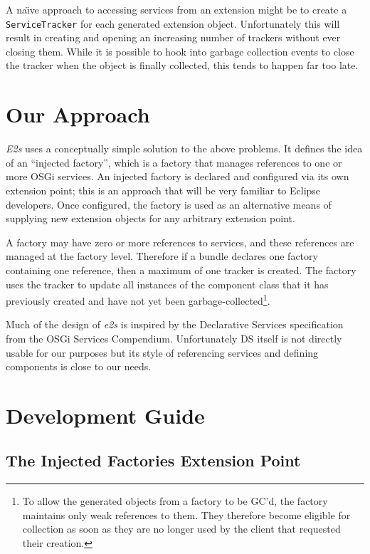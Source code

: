 \documentclass[12pt]{article}
\begin{document}
A na\"\i{}ve approach to accessing services from an extension might be to create a \texttt{ServiceTracker} for each generated extension object. Unfortunately this will result in creating and opening an increasing number of trackers without ever closing them. While it is possible to hook into garbage collection events to close the tracker when the object is finally collected, this tends to happen far too late.

\section{Our Approach}

\emph{E2s} uses a conceptually simple solution to the above problems. It defines
the idea of an ``injected factory'', which is a factory that manages references
to one or more OSGi services. An injected factory is declared and configured via
its own extension point; this is an approach that will be very familiar to
Eclipse developers. Once configured, the factory is used as an alternative means
of supplying new extension objects for any arbitrary extension point.

A factory may have zero or more references to services, and these references are
managed at the factory level. Therefore if a bundle declares one factory
containing one reference, then a maximum of one tracker is created. The factory
uses the tracker to update all instances of the component class that it has
previously created and have not yet been garbage-collected\footnote{To allow the
generated objects from a factory to be GC'd, the factory maintains only weak
references to them. They therefore become eligible for collection as soon as they
are no longer used by the client that requested their creation.}.

Much of the design of \emph{e2s} is inspired by the Declarative Services
specification from the OSGi Services Compendium. Unfortunately DS itself is not
directly usable for our purposes but its style of referencing services and
defining components is close to our needs.

\section{Development Guide}

\subsection{The Injected Factories Extension Point}
\end{document}
